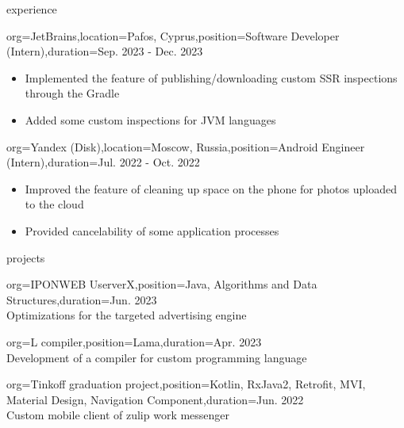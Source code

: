 \documentclass{resume}
\begin{document}
\begin{ResumeSection}{experience}
	    \begin{ResumeSubsection}{org=JetBrains,location={Pafos, Cyprus},position={Software Developer (Intern)},duration=Sep. 2023 - Dec. 2023}
        \begin{itemize}
            \item Implemented the feature of publishing/downloading custom SSR inspections through the Gradle
            \item Added some custom inspections for JVM languages
        \end{itemize}
    \end{ResumeSubsection}
    \begin{ResumeSubsection}{org=Yandex (Disk),location={Moscow, Russia},position={Android Engineer (Intern)},duration=Jul. 2022 - Oct. 2022} 
        \begin{itemize}
            \item Improved the feature of cleaning up space on the phone for photos uploaded to the cloud
            \item Provided cancelability of some application processes
        \end{itemize}
    \end{ResumeSubsection}
\end{ResumeSection}

\begin{ResumeSection}{projects}
\begin{ResumeSubsection}{org=IPONWEB UserverX,position={Java, Algorithms and Data Structures},duration={Jun. 2023}} \\
Optimizations for the targeted advertising engine \vspace{4pt}

\end{ResumeSubsection}

\begin{ResumeSubsection}{org=L compiler,position={Lama},duration={Apr. 2023}} \\
	Development of a compiler for custom programming language
 \vspace{4pt}

\end{ResumeSubsection}
\begin{ResumeSubsection}{org=Tinkoff graduation project,position={Kotlin, RxJava2, Retrofit, MVI, Material Design, Navigation Component},duration={Jun. 2022}} \\
Custom mobile client of zulip work messenger \vspace{4pt}
\end{ResumeSubsection}
\end{ResumeSection}
\end{document}
